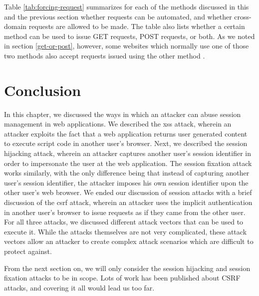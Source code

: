 Table \ref{tab:forcing-request} summarizes for each of the methods discussed in this and the previous section whether requests can be automated, and whether cross-domain requests are allowed to be made. The table also lists whether a certain method can be used to issue GET requests, POST requests, or both. As we noted in section \ref{get-or-post}, however, some websites which normally use one of those two methods also accept requests issued using the other method \cite{Zeller2008}.

\section{Conclusion}

In this chapter, we discussed the ways in which an attacker can abuse session management in web applications. We described the \gls{xss} attack, wherein an attacker exploits the fact that a web application returns user generated content to execute script code in another user's browser. Next, we described the \gls{session hijacking} attack, wherein an attacker captures another user's session identifier in order to impersonate the user at the web application. The \gls{session fixation} attack works similarly, with the only difference being that instead of capturing another user's session identifier, the attacker imposes his own session identifier upon the other user's web browser. We ended our discussion of session attacks with a brief discussion of the \gls{csrf} attack, wherein an attacker uses the implicit authentication in another user's browser to issue requests as if they came from the other user. For all three attacks, we discussed different attack vectors that can be used to execute it. While the attacks themselves are not very complicated, these attack vectors allow an attacker to create complex attack scenarios which are difficult to protect against.

From the next section on, we will only consider the session hijacking and session fixation attacks to be in scope. Lots of work has been published about CSRF attacks, and covering it all would lead us too far.
